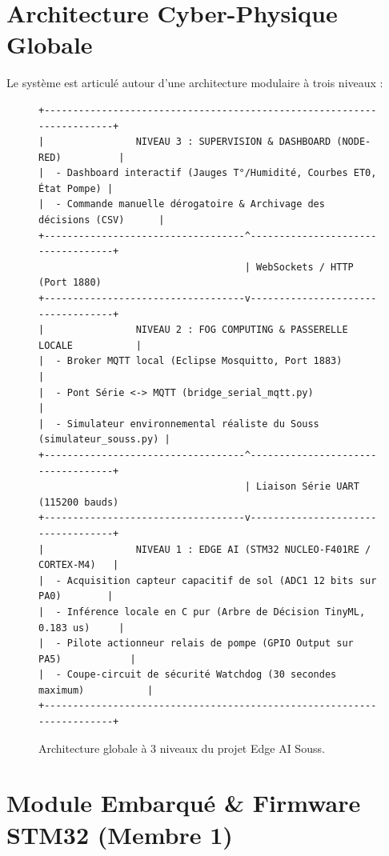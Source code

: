 \documentclass[11pt,a4paper]{report}
\begin{document}
\chapter{Architecture Cyber-Physique Globale}

Le système est articulé autour d'une architecture modulaire à trois niveaux :
\begin{figure}[H]
    \centering
    \begin{tcolorbox}[colback=white,colframe=primary,arc=2mm,title=\textbf{Architecture Distribuée Edge-Fog-Supervision}]
    \begin{verbatim}
+-----------------------------------------------------------------------+
|                NIVEAU 3 : SUPERVISION & DASHBOARD (NODE-RED)          |
|  - Dashboard interactif (Jauges T°/Humidité, Courbes ET0, État Pompe) |
|  - Commande manuelle dérogatoire & Archivage des décisions (CSV)      |
+-----------------------------------^-----------------------------------+
                                    | WebSockets / HTTP (Port 1880)
+-----------------------------------v-----------------------------------+
|                NIVEAU 2 : FOG COMPUTING & PASSERELLE LOCALE           |
|  - Broker MQTT local (Eclipse Mosquitto, Port 1883)                   |
|  - Pont Série <-> MQTT (bridge_serial_mqtt.py)                        |
|  - Simulateur environnemental réaliste du Souss (simulateur_souss.py) |
+-----------------------------------^-----------------------------------+
                                    | Liaison Série UART (115200 bauds)
+-----------------------------------v-----------------------------------+
|                NIVEAU 1 : EDGE AI (STM32 NUCLEO-F401RE / CORTEX-M4)   |
|  - Acquisition capteur capacitif de sol (ADC1 12 bits sur PA0)        |
|  - Inférence locale en C pur (Arbre de Décision TinyML, 0.183 us)     |
|  - Pilote actionneur relais de pompe (GPIO Output sur PA5)            |
|  - Coupe-circuit de sécurité Watchdog (30 secondes maximum)           |
+-----------------------------------------------------------------------+
    \end{verbatim}
    \end{tcolorbox}
    \caption{Architecture globale à 3 niveaux du projet Edge AI Souss.}
\end{figure}

\chapter{Module Embarqué \& Firmware STM32 (Membre 1)}
\end{document}
